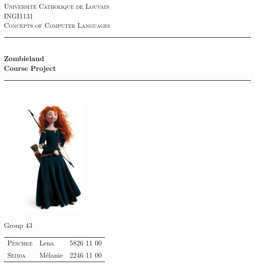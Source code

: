 \documentclass[12pt,a4paper]{article}
\begin{document}
	
\begin{titlepage}
\newcommand{\HRule}{\rule{\linewidth}{0.5mm}} %
\centering %
 
\null
\vspace{1cm}
\textsc{\Large Université Catholique de Louvain}\\[1cm] %
\textsc{\large INGI1131 \\[0.3cm] Concepts of Computer Languages}\\[0.5cm] %


\HRule \\[0.4cm]
{ \LARGE \bfseries Zombieland\\[0.4cm] %
\large \bfseries Course Project} \\[0.4cm]

\HRule \\[0.5cm]
 
\begin{figure}[!h]
	\begin{center}
		\includegraphics[width=0.28\textwidth]{merida.jpg}
	\end{center}
\end{figure}


\large
\begin{centering}
Group 43\\
\end{centering}
{\begin{tabular}{lll}
\textsc{Peschke} & Lena & 5826 11 00\\
\textsc{Sedda} & Mélanie & 2246 11 00\\
\end{tabular}}
\\[1cm]


\end{titlepage}
\end{document}
